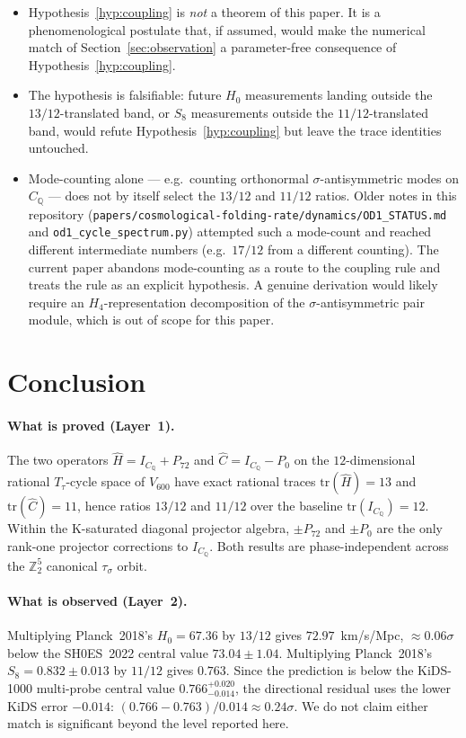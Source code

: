 \documentclass[11pt]{article}
\newcommand{\Vsixhundred}{V_{600}}
\newcommand{\CQ}{C_{\mathbb{Q}}}
\newcommand{\IC}{I_{\CQ}}
\newcommand{\PK}[1]{P_{#1}}
\newcommand{\Hop}{\hat H}
\newcommand{\Cop}{\hat C}
\newcommand{\Ttau}{T_{\tau}}
\newcommand{\Hzero}{H_0}
\begin{document}
\begin{itemize}[leftmargin=2em]
\item Hypothesis~\ref{hyp:coupling} is \emph{not} a theorem of this
paper. It is a phenomenological postulate that, if assumed, would
make the numerical match of Section~\ref{sec:observation} a
parameter-free consequence of Hypothesis~\ref{hyp:coupling}.
\item The hypothesis is falsifiable: future $\Hzero$ measurements
landing outside the $13/12$-translated band, or $S_8$ measurements
outside the $11/12$-translated band, would refute
Hypothesis~\ref{hyp:coupling} but leave the trace identities
untouched.
\item Mode-counting alone --- e.g.\ counting orthonormal
$\sigma$-antisymmetric modes on $\CQ$ --- does not by itself select
the $13/12$ and $11/12$ ratios. Older notes in this repository
(\texttt{papers/cosmological-folding-rate/dynamics/OD1\_STATUS.md}
and \texttt{od1\_cycle\_spectrum.py}) attempted such a mode-count
and reached different intermediate numbers (e.g.\ $17/12$ from a
different counting). The current paper
abandons mode-counting as a route to the coupling rule and treats
the rule as an explicit hypothesis. A genuine derivation would
likely require an $H_4$-representation decomposition of the
$\sigma$-antisymmetric pair module, which is out of scope for this
paper.
\end{itemize}

\section{Conclusion}\label{sec:conclusion}

\paragraph{What is proved (Layer~1).}
The two operators
$\Hop = \IC + \PK{72}$ and $\Cop = \IC - \PK{0}$
on the $12$-dimensional rational $\Ttau$-cycle space of
$\Vsixhundred$ have exact rational traces $\mathrm{tr}(\Hop) = 13$
and $\mathrm{tr}(\Cop) = 11$, hence ratios $13/12$ and $11/12$ over
the baseline $\mathrm{tr}(\IC) = 12$. Within the K-saturated
diagonal projector algebra, $\pm\PK{72}$ and $\pm\PK{0}$ are the
only rank-one projector corrections to $\IC$. Both results are
phase-independent across the $\mathbb{Z}_2^5$ canonical
$\tau_\sigma$ orbit.

\paragraph{What is observed (Layer~2).}
Multiplying Planck~2018's $\Hzero = 67.36$ by $13/12$ gives
$72.97$~km/s/Mpc, $\approx 0.06\sigma$ below the SH0ES~2022 central
value $73.04 \pm 1.04$. Multiplying Planck~2018's
$S_8 = 0.832 \pm 0.013$ by $11/12$ gives $0.763$. Since the
prediction is below the KiDS-1000 multi-probe central value
$0.766^{+0.020}_{-0.014}$, the directional residual uses the lower
KiDS error $-0.014$:
$(0.766 - 0.763)/0.014 \approx 0.24\sigma$. We do not claim either
match is significant beyond the level reported here.
\end{document}
